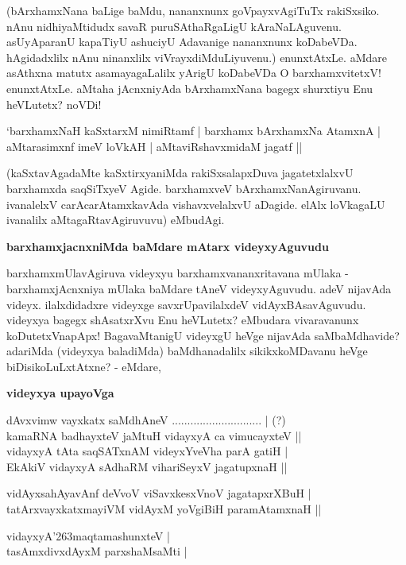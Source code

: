 (bArxhamxNana baLige baMdu, nananxnunx goVpayxvAgiTuTx rakiSxsiko. nAnu nidhiyaMtidudx savaR puruSAthaRgaLigU kAraNaLAguvenu. asUyAparanU kapaTiyU ashuciyU Adavanige nananxnunx koDabeVDa. hAgidadxlilx nAnu ninanxlilx viVrayxdiMduLiyuvenu.) enunxtAtxLe. aMdare asAthxna matutx asamayagaLalilx yArigU koDabeVDa O barxhamxvitetxV! enunxtAtxLe. aMtaha jAcnxniyAda bArxhamxNana bagegx shurxtiyu Enu heVLutetx? noVDi!

\begin{shloka}
`barxhamxNaH kaSxtarxM nimiRtamf | barxhamx bArxhamxNa AtamxnA |\\\label{85}
aMtarasimxnf imeV loVkAH | aMtaviRshavxmidaM jagatf ||
\end{shloka}

(kaSxtavAgadaMte kaSxtirxyaniMda rakiSxsalapxDuva jagatetxlalxvU barxhamxda saqSiTxyeV Agide. barxhamxveV bArxhamxNanAgiruvanu. ivanalelxV carAcarAtamxkavAda vishavxvelalxvU aDagide. elAlx loVkagaLU ivanalilx aMtagaRtavAgiruvuvu) eMbudAgi. 

\noindent
\textbf{barxhamxjacnxniMda baMdare mAtarx videyxyAguvudu}\label{page85}

barxhamxmUlavAgiruva videyxyu barxhamxvananxritavana mUlaka - barxhamxjAcnxniya mUlaka baMdare tAneV videyxyAguvudu. adeV nijavAda videyx. ilalxdidadxre videyxge savxrUpavilalxdeV vidAyxBAsavAguvudu. videyxya bagegx shAsatxrXvu Enu heVLutetx? eMbudara vivaravanunx koDutetxVnapApx! BagavaMtanigU videyxgU heVge nijavAda saMbaMdhavide? adariMda (videyxya baladiMda) baMdhanadalilx sikikxkoMDavanu heVge biDisikoLuLxtAtxne? - eMdare,

\noindent
\textbf{videyxya upayoVga}

\begin{shloka}
dAvxvimw vayxkatx saMdhAneV ............................. | (?)\\\label{86}
kamaRNA badhayxteV jaMtuH vidayxyA ca vimucayxteV ||\\

vidayxyA tAta saqSATxnAM videyxYveVha parA gatiH |\\\label{86}
EkAkiV vidayxyA sAdhaRM vihariSeyxV jagatupxnaH ||\\\label{86}

vidAyxsahAyavAnf deVvoV viSavxkesxVnoV jagatapxrXBuH |\\\label{86}
tatArxvayxkatxmayiVM vidAyxM yoVgiBiH paramAtamxnaH ||\\\label{86}

vidayxyA\char'263maqtamashunxteV |\\\label{86}
tasAmxdivxdAyxM parxshaMsaMti |\label{86}
\end{shloka}


